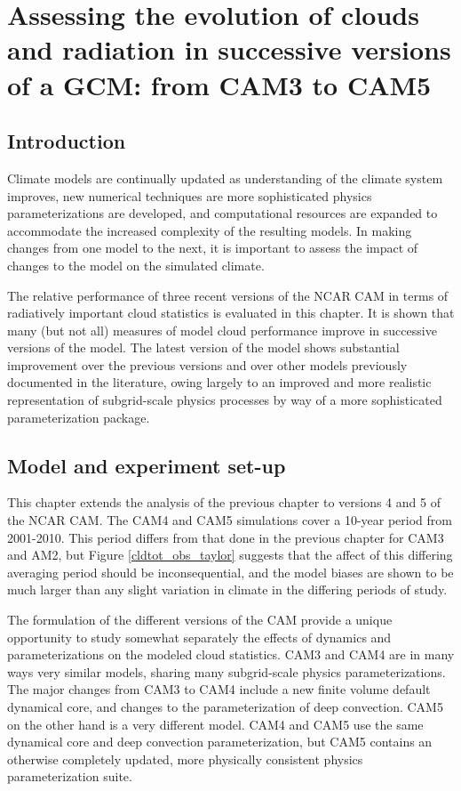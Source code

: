 \chapter{Assessing the evolution of clouds and radiation in successive versions of a GCM: from CAM3 to CAM5}
\label{camamip}
\section{Introduction}
Climate models are continually updated as understanding of the climate system improves, new numerical techniques are more sophisticated physics parameterizations are developed, and computational resources are expanded to accommodate the increased complexity of the resulting models. In making changes from one model to the next, it is important to assess the impact of changes to the model on the simulated climate.

The relative performance of three recent versions of the NCAR CAM in terms of radiatively important cloud statistics is evaluated in this chapter. It is shown that many (but not all) measures of model cloud performance improve in successive versions of the model. The latest version of the model shows substantial improvement over the previous versions and over other models previously documented in the literature, owing largely to an improved and more realistic representation of subgrid-scale physics processes by way of a more sophisticated parameterization package.

\section{Model and experiment set-up}
This chapter extends the analysis of the previous chapter to versions 4 and 5 of the NCAR CAM. The CAM4 and CAM5 simulations cover a 10-year period from 2001-2010. This period differs from that done in the previous chapter for CAM3 and AM2, but Figure \ref{cldtot_obs_taylor} suggests that the affect of this differing averaging period should be inconsequential, and the model biases are shown to be much larger than any slight variation in climate in the differing periods of study.

The formulation of the different versions of the CAM provide a unique opportunity to study somewhat separately the effects of dynamics and parameterizations on the modeled cloud statistics. CAM3 and CAM4 are in many ways very similar models, sharing many subgrid-scale physics parameterizations. The major changes from CAM3 to CAM4 include a new finite volume default dynamical core, and changes to the parameterization of deep convection. CAM5 on the other hand is a very different model. CAM4 and CAM5 use the same dynamical core and deep convection parameterization, but CAM5 contains an otherwise completely updated, more physically consistent physics parameterization suite.

